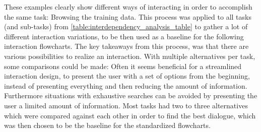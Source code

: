 \documentclass[11pt,a4paper,english]{scrreprt}
\begin{document}
These examples clearly show different ways of interacting in order to accomplish the same task: Browsing the training data. This process was applied to all tasks (and sub-tasks) from \autoref{table:interdependency_analysis_table} to gather a lot of different interaction variations, to be then used as a baseline for the following interaction flowcharts. The key takeaways from this process, was that there are various possibilities to realize an interaction. With multiple alternatives per task, some comparisons could be made: Often it seems beneficial for a streamlined interaction design, to present the user with a set of options from the beginning, instead of presenting everything and then reducing the amount of information. Furthermore situations with exhaustive searches can be avoided by presenting the user a limited amount of information. Most tasks had two to three alternatives which were compared against each other in order to find the best dialogue, which was then chosen to be the baseline for the standardized flowcharts.
\end{document}
